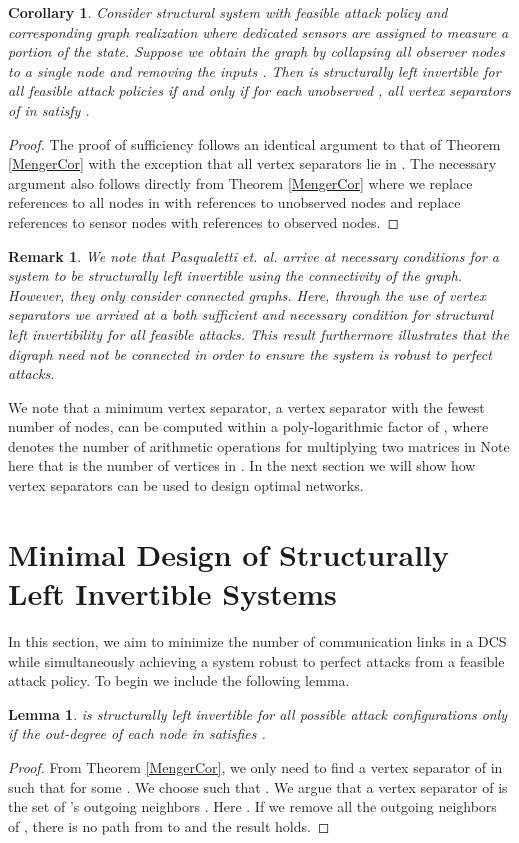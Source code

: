 \documentclass[letterpaper, 10 pt, conference]{ieeeconf}
\newtheorem{lemma}[theorem]{Lemma}
\newtheorem{corollary}[theorem]{Corollary}
\newtheorem{remark}[theorem]{Remark}
\begin{document}
\begin{corollary}
Consider structural system   with feasible attack policy  and corresponding graph realization  where  dedicated sensors are assigned to measure a portion of the state. Suppose we obtain the graph  by collapsing all observer nodes to a single node  and removing the inputs . Then  is structurally left invertible for all feasible attack policies  if and only if for each unobserved , all vertex separators  of  in  satisfy . \label{VS ABC} 
\end{corollary}
\begin{proof}
    The proof of sufficiency follows an identical argument to that of Theorem \ref{MengerCor} with the exception that all vertex separators lie in . The necessary argument also follows directly from Theorem \ref{MengerCor} where we replace references to all nodes in  with references to unobserved nodes  and replace references to sensor nodes  with references to observed nodes.
\end{proof}
\begin{remark}
We note that Pasqualetti et. al. \cite{PasqualettiConsensusUnreliable} arrive at necessary conditions for a system to be structurally left invertible using the connectivity of the graph. However, they only consider connected graphs. Here, through the use of vertex separators we arrived at a both sufficient and necessary condition for structural left invertibility for all feasible attacks. This result furthermore illustrates that the digraph need not be connected in order to ensure the system is robust to perfect attacks.
\end{remark}

We note that a minimum vertex separator, a vertex separator with the fewest number of nodes, can be computed  within a poly-logarithmic factor of , where  denotes the number of arithmetic operations for multiplying two matrices in  \cite{Cheriyan1997} Note here that  is the number of vertices in . In the next section we will show how vertex separators can be used to design optimal networks.

\section{Minimal Design of Structurally Left Invertible Systems}
In this section, we aim to minimize the number of communication links in a DCS while simultaneously achieving a system robust to perfect attacks from a feasible attack policy. To begin we include the following lemma.
\begin{lemma}
  is structurally left invertible for all possible attack configurations  only if the out-degree of each node  in  satisfies . \label{NECLEMMA}
\end{lemma}
\begin{proof}
From Theorem \ref{MengerCor}, we only need to find a vertex separator  of  in  such that  for some . We choose  such that . We argue that a vertex separator of  is the set of 's outgoing neighbors . Here . If we remove all the outgoing neighbors of , there is no path from  to  and the result holds.
\end{proof}
\end{document}
